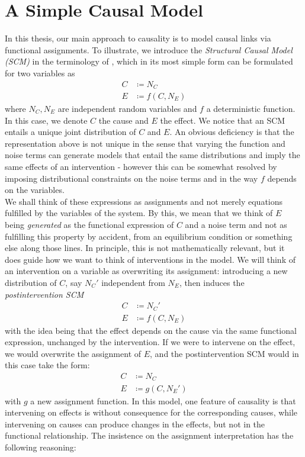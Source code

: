 \documentclass[11pt, a4paper]{memoir}
\theoremstyle{break}
\theoremstyle{break}
\theoremstyle{nonumberplain}
\begin{document}
\section{A Simple Causal Model}
In this thesis, our main approach to causality is to model causal links via functional assignments. To illustrate, we introduce the \textit{Structural Causal Model (SCM)} in the terminology of \cite{Peters}, which in its most simple form can be formulated for two variables as
\begin{align*}
C&\coloneqq N_C\\
E&\coloneqq f(C,N_E)
\end{align*}
where $N_C,N_E$ are independent random variables and $f$ a deterministic function. In this case, we denote $C$ the cause and $E$ the effect. We notice that an SCM entails a unique joint distribution of $C$ and $E$. An obvious deficiency is that the representation above is not unique in the sense that varying the function and noise terms can generate models that entail the same distributions and imply the same effects of an intervention - however this can be somewhat resolved by imposing distributional constraints on the noise terms and in the way $f$ depends on the variables.\\[5pt]
We shall think of these expressions as assignments and not merely equations fulfilled by the variables of the system. By this, we mean that we think of $E$ being \textit{generated} as the functional expression of $C$ and a noise term and not as fulfilling this property by accident, from an equilibrium condition or something else along those lines. In principle, this is not mathematically relevant, but it does guide how we want to think of interventions in the model. We will think of an intervention on a variable as overwriting its assignment: introducing a new distribution of $C$, say $N_C'$ independent from $N_E$, then induces the \emph{postintervention SCM}
\begin{align*}
C&\coloneqq N_C'\\
E&\coloneqq f(C,N_E)
\end{align*}
with the idea being that the effect depends on the cause via the same functional expression, unchanged by the intervention. If we were to intervene on the effect, we would overwrite the assignment of $E$, and the postintervention SCM would in this case take the form:
\begin{align*}
C&\coloneqq N_C\\
E&\coloneqq g(C,N_E')
\end{align*} 
with $g$ a new assignment function. In this model, one feature of causality is that intervening on effects is without consequence for the corresponding causes, while intervening on causes can produce changes in the effects, but not in the functional relationship. The insistence on the assignment interpretation has the following reasoning:
\end{document}

